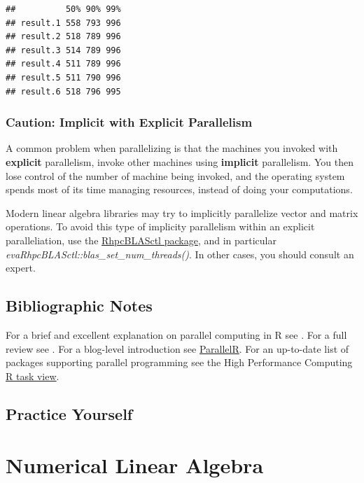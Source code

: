 \documentclass[]{book}
\theoremstyle{definition}
\theoremstyle{definition}
\theoremstyle{definition}
\theoremstyle{remark}
\begin{document}
\begin{verbatim}
##          50% 90% 99%
## result.1 558 793 996
## result.2 518 789 996
## result.3 514 789 996
## result.4 511 789 996
## result.5 511 790 996
## result.6 518 796 995
\end{verbatim}

\subsection{Caution: Implicit with Explicit
Parallelism}\label{caution-implicit-with-explicit-parallelism}

A common problem when parallelizing is that the machines you invoked
with \textbf{explicit} parallelism, invoke other machines using
\textbf{implicit} parallelism. You then lose control of the number of
machine being invoked, and the operating system spends most of its time
managing resources, instead of doing your computations.

Modern linear algebra libraries may try to implicitly parallelize vector
and matrix operations. To avoid this type of implicity parallelism
within an explicit paralleliation, use the \href{}{RhpcBLASctl package},
and in particular \emph{evaRhpcBLASctl::blas\_set\_num\_threads()}. In
other cases, you should consult an expert.

\section{Bibliographic Notes}\label{bibliographic-notes-13}

For a brief and excellent explanation on parallel computing in R see
\citet{schmidberger2009state}. For a full review see
\citet{chapple2016mastering}. For a blog-level introduction see
\href{http://www.parallelr.com/r-with-parallel-computing/}{ParallelR}.
For an up-to-date list of packages supporting parallel programming see
the High Performance Computing
\href{https://cran.r-project.org/web/views/HighPerformanceComputing.html}{R
task view}.

\section{Practice Yourself}\label{practice-yourself-12}

\chapter{Numerical Linear Algebra}\label{algebra}
\end{document}
